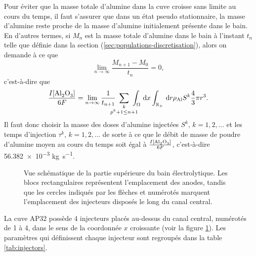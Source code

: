 Pour éviter que la masse totale d'alumine dans la cuve croisse sans
limite au cours du temps, il faut s'assurer que dans un état pseudo
stationnaire, la masse d'alumine reste proche de la masse d'alumine
initialement présente dans le bain. En d'autres termes, si $M_n$ est
la masse totale d'alumine dans le bain à l'instant $t_n$ telle que
définie dans la section (\ref{sec:populations-discretisation}), alors
on demande à ce que
\begin{equation*}
\lim_{n\to\infty} \frac{M_{n+1} - M_{0}}{t_n} = 0,
\end{equation*}
c'est-à-dire que
\begin{equation}\label{eq:injection-mass-condition}
  \frac{I[\cee{Al2O3}]}{6F}
  =\lim_{n\to \infty}\frac{1}{t_{n+1}}\ \sum_{\mathclap{\substack{k\\ p^k + 1\leq n +
        1}}}\ \int_\Omega\intd{x}\int_\rplus\intd{r}\aluminadensity S^k \frac{4}{3}\pi r^3.
\end{equation}
Il faut donc choisir la masse des doses d'alumine injectées $S^k$, $k
= 1, 2,\dots$ et les temps d'injection $\tau^k$, $k = 1,2,\dots$ de
sorte à ce que le débit de masse de poudre d'alumine moyen au cours du
temps soit égal à $\frac{I[\cee{Al2O3}]}{6F}$, c'est-à-dire
\num{56.382e-3} \si{\kilo\gram\per\second}.

\begin{figure}
  \begin{center}
    
    \caption{Vue schématique de la partie supérieure du bain
      électrolytique. Les blocs rectangulaires représentent
      l'emplacement des anodes, tandis que les cercles indiqués par
      les flèches et numérotés marquent l'emplacement des injecteurs
      disposés le long du canal central.}
    \label{fig:anode-configuration}
  \end{center}
\end{figure}

La cuve AP32 possède 4 injecteurs placés au-dessus du canal central,
numérotés de 1 à 4, dans le sens de la coordonnée $x$ croissante (voir
la figure \ref{fig:anode-configuration}). Les paramètres qui
définissent chaque injecteur sont regroupés dans la table
\ref{tab:injectors}.

